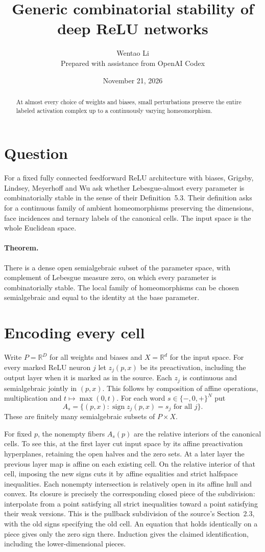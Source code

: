\documentclass[11pt]{article}
\title{Generic combinatorial stability of deep ReLU networks}
\author{Wentao Li\\{\small Prepared with assistance from OpenAI Codex}}
\date{November 21, 2026}
\begin{document}
\maketitle
\begin{abstract}
At almost every choice of weights and biases, small perturbations preserve the entire labeled activation complex up to a continuously varying homeomorphism.
\end{abstract}
\section*{Question}
For a fixed fully connected feedforward ReLU architecture with biases, Grigsby, Lindsey, Meyerhoff and Wu ask whether Lebesgue-almost every parameter is combinatorially stable in the sense of their Definition~5.3. Their definition asks for a continuous family of ambient homeomorphisms preserving the dimensions, face incidences and ternary labels of the canonical cells. The input space is the whole Euclidean space.

\paragraph{Theorem.} There is a dense open semialgebraic subset of the parameter space, with complement of Lebesgue measure zero, on which every parameter is combinatorially stable. The local family of homeomorphisms can be chosen semialgebraic and equal to the identity at the base parameter.

\section*{Encoding every cell}
Write $P=\mathbb R^D$ for all weights and biases and $X=\mathbb R^d$ for the input space. For every marked ReLU neuron $j$ let $z_j(p,x)$ be its preactivation, including the output layer when it is marked as in the source. Each $z_j$ is continuous and semialgebraic jointly in $(p,x)$. This follows by composition of affine operations, multiplication and $t\mapsto\max(0,t)$. For each word $s\in\{-,0,+\}^N$ put
\[
 A_s=\{(p,x):\operatorname{sign}z_j(p,x)=s_j\text{ for all }j\}.
\]
These are finitely many semialgebraic subsets of $P\times X$.

For fixed $p$, the nonempty fibers $A_s(p)$ are the relative interiors of the canonical cells. To see this, at the first layer cut input space by its affine preactivation hyperplanes, retaining the open halves and the zero sets. At a later layer the previous layer map is affine on each existing cell. On the relative interior of that cell, imposing the new signs cuts it by affine equalities and strict halfspace inequalities. Each nonempty intersection is relatively open in its affine hull and convex. Its closure is precisely the corresponding closed piece of the subdivision: interpolate from a point satisfying all strict inequalities toward a point satisfying their weak versions. This is the pullback subdivision of the source's Section~2.3, with the old signs specifying the old cell. An equation that holds identically on a piece gives only the zero sign there. Induction gives the claimed identification, including the lower-dimensional pieces.
\end{document}
